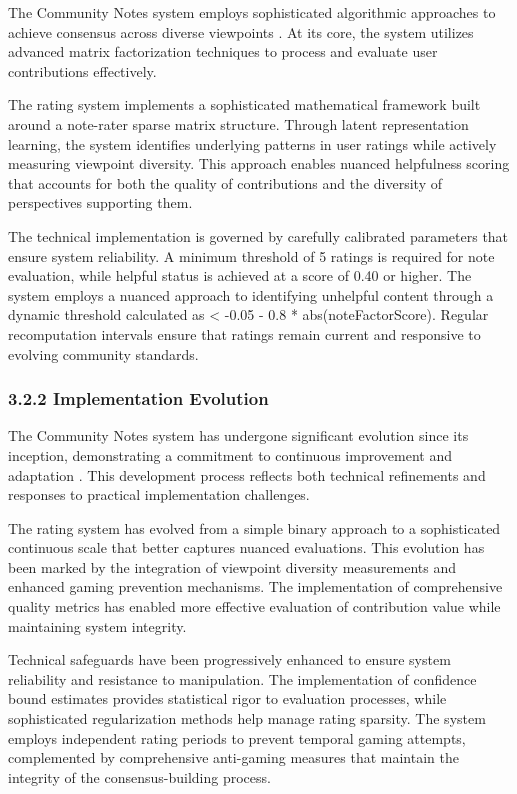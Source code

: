 The Community Notes system employs sophisticated algorithmic approaches to achieve consensus across diverse viewpoints \citep{communitynotes2024}. At its core, the system utilizes advanced matrix factorization techniques to process and evaluate user contributions effectively.

The rating system implements a sophisticated mathematical framework built around a note-rater sparse matrix structure. Through latent representation learning, the system identifies underlying patterns in user ratings while actively measuring viewpoint diversity. This approach enables nuanced helpfulness scoring that accounts for both the quality of contributions and the diversity of perspectives supporting them.

The technical implementation is governed by carefully calibrated parameters that ensure system reliability. A minimum threshold of 5 ratings is required for note evaluation, while helpful status is achieved at a score of 0.40 or higher. The system employs a nuanced approach to identifying unhelpful content through a dynamic threshold calculated as \textless{} -0.05 - 0.8 * abs(noteFactorScore). Regular recomputation intervals ensure that ratings remain current and responsive to evolving community standards.

\hypertarget{implementation-evolution}{%
\subsubsection{3.2.2 Implementation Evolution}\label{implementation-evolution}}

The Community Notes system has undergone significant evolution since its inception, demonstrating a commitment to continuous improvement and adaptation \citep{communitynotes2024}. This development process reflects both technical refinements and responses to practical implementation challenges.

The rating system has evolved from a simple binary approach to a sophisticated continuous scale that better captures nuanced evaluations. This evolution has been marked by the integration of viewpoint diversity measurements and enhanced gaming prevention mechanisms. The implementation of comprehensive quality metrics has enabled more effective evaluation of contribution value while maintaining system integrity.

Technical safeguards have been progressively enhanced to ensure system reliability and resistance to manipulation. The implementation of confidence bound estimates provides statistical rigor to evaluation processes, while sophisticated regularization methods help manage rating sparsity. The system employs independent rating periods to prevent temporal gaming attempts, complemented by comprehensive anti-gaming measures that maintain the integrity of the consensus-building process.

